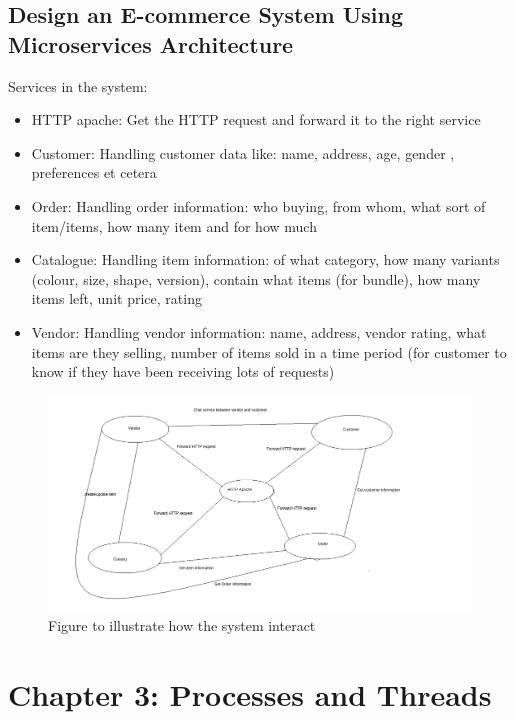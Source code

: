 \documentclass[11pt,a4paper]{report}
\begin{document}
	\section{Design an E-commerce System Using Microservices Architecture}
	Services in the system:
	\begin{itemize}
		\item HTTP apache: Get the HTTP request and forward it to the right service
		\item Customer: Handling customer data like: name, address, age, gender , preferences et cetera
		\item Order: Handling order information: who buying, from whom, what sort of item/items, how many item and for how much
		\item Catalogue: Handling item information: of what category, how many variants (colour, size, shape, version), contain what items (for bundle), how many items left, unit price, rating
		\item Vendor: Handling vendor information: name, address, vendor rating, what items are they selling, number of items sold in a time period (for customer to know if they have been receiving lots of requests)
	\end{itemize}
	\begin{figure}[h!]
  			\includegraphics[width=\linewidth]{e-comm.png}
  			\caption{Figure to illustrate how the system interact}
  			\label{fig:ecomm}
		\end{figure}
		
	\chapter{Chapter 3: Processes and Threads}
	\newpage
  	
\end{document}
